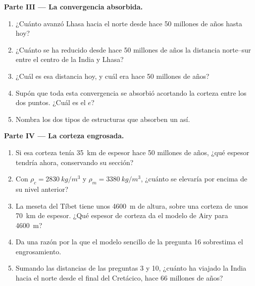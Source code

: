 \begin{problem}
\medskip
\noindent\textbf{Parte III --- La convergencia absorbida.}
\begin{enumerate}[resume]
  \item ¿Cuánto avanzó Lhasa hacia el norte desde hace 50 millones de años hasta hoy?
  \item ¿Cuánto se ha reducido desde hace 50 millones de años la distancia
        norte--sur entre el centro de la India y Lhasa?
  \item ¿Cuál es esa distancia hoy, y cuál era hace 50 millones de años?
  \item Supón que toda esta convergencia se absorbió acortando la corteza
        entre los dos puntos. ¿Cuál es el  $e$?
  \item Nombra los dos tipos de estructuras que absorben un  así.
\end{enumerate}

\medskip
\noindent\textbf{Parte IV --- La corteza engrosada.}
\begin{enumerate}[resume]
  \item Si esa corteza tenía \qty{35}{km} de espesor hace 50 millones de años,
        ¿qué espesor tendría ahora, conservando su sección?
  \item Con $\rho_c = \qty{2830}{kg/m^3}$ y $\rho_m = \qty{3380}{kg/m^3}$,
        ¿cuánto se elevaría por encima de su nivel anterior?
  \item La meseta del Tíbet tiene unos \qty{4600}{m} de altura, sobre una
        corteza de unos \qty{70}{km} de espesor. ¿Qué espesor de corteza da el
        modelo de Airy para \qty{4600}{m}?
  \item Da una razón por la que el modelo sencillo de la pregunta 16
        sobrestima el engrosamiento.
  \item Sumando las distancias de las preguntas 3 y 10, ¿cuánto ha viajado la
        India hacia el norte desde el final del Cretácico, hace 66 millones de
        años?
\end{enumerate}
\end{problem}
